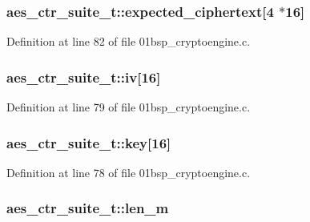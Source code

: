 \subsubsection[{\texorpdfstring{expected\+\_\+ciphertext}{expected_ciphertext}}]{ aes\+\_\+ctr\+\_\+suite\+\_\+t\+::expected\+\_\+ciphertext\mbox{[}4 $\ast$16\mbox{]}}\hypertarget{structaes__ctr__suite__t_a23782904c47d1729b768332f48f2e3dc}{}\label{structaes__ctr__suite__t_a23782904c47d1729b768332f48f2e3dc}


Definition at line 82 of file 01bsp\+\_\+cryptoengine.\+c.

\subsubsection[{\texorpdfstring{iv}{iv}}]{ aes\+\_\+ctr\+\_\+suite\+\_\+t\+::iv\mbox{[}16\mbox{]}}\hypertarget{structaes__ctr__suite__t_ae0a3edbc4df057fed4a6242dcfb71e04}{}\label{structaes__ctr__suite__t_ae0a3edbc4df057fed4a6242dcfb71e04}


Definition at line 79 of file 01bsp\+\_\+cryptoengine.\+c.

\subsubsection[{\texorpdfstring{key}{key}}]{ aes\+\_\+ctr\+\_\+suite\+\_\+t\+::key\mbox{[}16\mbox{]}}\hypertarget{structaes__ctr__suite__t_ad36ce8b6fd4ae0375f7e72438cf9b577}{}\label{structaes__ctr__suite__t_ad36ce8b6fd4ae0375f7e72438cf9b577}


Definition at line 78 of file 01bsp\+\_\+cryptoengine.\+c.

\subsubsection[{\texorpdfstring{len\+\_\+m}{len_m}}]{ aes\+\_\+ctr\+\_\+suite\+\_\+t\+::len\+\_\+m}\hypertarget{structaes__ctr__suite__t_a04ece68639a0f54874b8fa08125d1a2b}{}\label{structaes__ctr__suite__t_a04ece68639a0f54874b8fa08125d1a2b}


